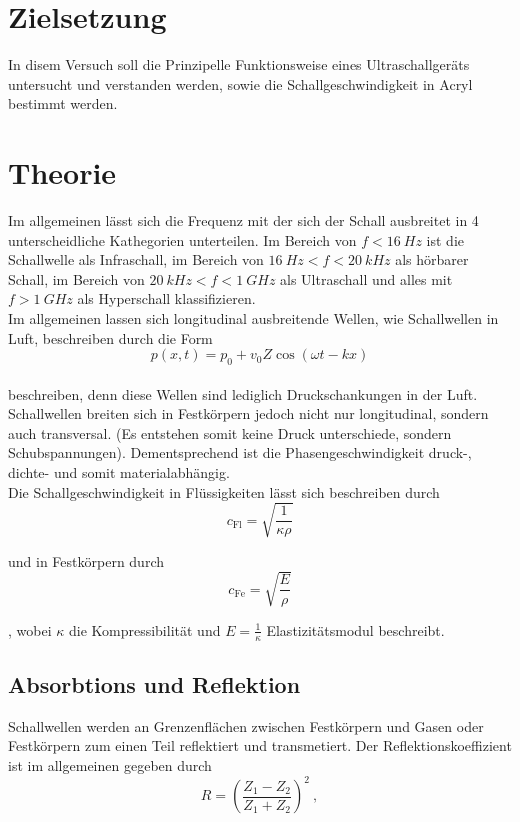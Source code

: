 \section*{Zielsetzung}
In disem Versuch soll die Prinzipelle Funktionsweise eines Ultraschallgeräts untersucht und verstanden werden, sowie die Schallgeschwindigkeit in Acryl bestimmt werden.

\section{Theorie}
Im allgemeinen lässt sich die Frequenz mit der sich der Schall ausbreitet in 4 unterscheidliche Kathegorien unterteilen. Im Bereich von $f < \SI{16}{Hz}$ ist die Schallwelle als Infraschall,
im Bereich von $\SI{16}{Hz} < f < \SI{20}{kHz}$ als hörbarer Schall, im Bereich von $\SI{20}{kHz} < f < \SI{1}{GHz}$ als Ultraschall und alles mit $f > \SI{1}{GHz}$ als Hyperschall
klassifizieren. \\ 
  
Im allgemeinen lassen sich longitudinal ausbreitende Wellen, wie Schallwellen in Luft, beschreiben durch die Form
\begin{equation}
  p(x,t) = p_0 + v_0 Z \cos{(\omega t - kx)}
\end{equation}
\\
beschreiben, denn diese Wellen sind lediglich Druckschankungen in der Luft. 
Schallwellen breiten sich in Festkörpern jedoch nicht nur longitudinal, sondern auch transversal. (Es entstehen somit keine Druck unterschiede, sondern Schubspannungen). 
Dementsprechend ist die Phasengeschwindigkeit druck-, dichte- und somit
materialabhängig. \\
Die Schallgeschwindigkeit in Flüssigkeiten lässt sich beschreiben durch 
\begin{equation}
  c_\text{Fl} = \sqrt{\frac{1}{\kappa \rho}}
  \label{eqn:schallgeschwindigkeit_flussigkeit}
\end{equation}

und in Festkörpern durch 
\begin{equation}
  c_\text{Fe} = \sqrt{\frac{E}{\rho}}
  \label{eqn:schallgeschwindigkeit_festkörper}
\end{equation}

, wobei $\kappa$ die Kompressibilität und  $E = \frac{1}{\kappa}$ Elastizitätsmodul beschreibt.

\subsection{Absorbtions und Reflektion}
Schallwellen werden an Grenzenflächen zwischen Festkörpern und Gasen oder Festkörpern zum einen Teil reflektiert und transmetiert. 
Der Reflektionskoeffizient ist im allgemeinen gegeben durch
\begin{equation}
  R = \left(\frac{Z_1 - Z_2}{Z_1 + Z_2}\right)^2 \ ,
  \label{eqn:reflexion}
\end{equation}

